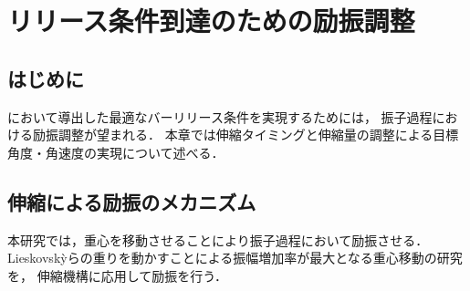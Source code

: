 \chapter[リリース条件到達のための励振調整]%
{リリース条件到達のための励振調整}
        \section{はじめに}

        において導出した最適なバーリリース条件を実現するためには，
        振子過程における励振調整が望まれる．
        本章では伸縮タイミングと伸縮量の調整による目標角度・角速度の実現について述べる．
          
        \section{伸縮による励振のメカニズム}

          本研究では，重心を移動させることにより振子過程において励振させる．
          Lieskovsk{\`y}らの重りを動かすことによる振幅増加率が最大となる重心移動の研究\cite{lieskovsky2023optimal}を，
          伸縮機構に応用して励振を行う．
          
